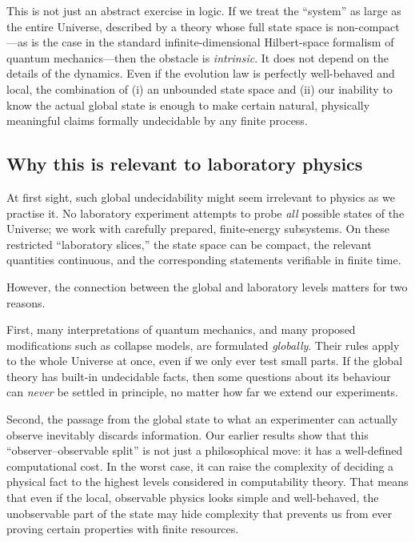 \documentclass[12pt]{article}
\theoremstyle{definition}
\theoremstyle{plain}
\begin{document}
This is not just an abstract exercise in logic. If we treat the ``system'' as
large as the entire Universe, described by a theory whose full state space is
non-compact---as is the case in the standard infinite-dimensional Hilbert-space
formalism of quantum mechanics---then the obstacle is \emph{intrinsic}. It does
not depend on the details of the dynamics. Even if the evolution law is
perfectly well-behaved and local, the combination of (i) an unbounded state
space and (ii) our inability to know the actual global state is enough to make
certain natural, physically meaningful claims formally undecidable by any
finite process.

\subsection{Why this is relevant to laboratory physics}

At first sight, such global undecidability might seem irrelevant to physics as
we practise it. No laboratory experiment attempts to probe \emph{all} possible
states of the Universe; we work with carefully prepared, finite-energy
subsystems. On these restricted ``laboratory slices,'' the state space can be
compact, the relevant quantities continuous, and the corresponding statements
verifiable in finite time.

However, the connection between the global and laboratory levels matters for
two reasons.

First, many interpretations of quantum mechanics, and many proposed
modifications such as collapse models, are formulated \emph{globally}. Their
rules apply to the whole Universe at once, even if we only ever test small
parts. If the global theory has built-in undecidable facts, then some questions
about its behaviour can \emph{never} be settled in principle, no matter how far
we extend our experiments.

Second, the passage from the global state to what an experimenter can actually
observe inevitably discards information. Our earlier results show that this
``observer--observable split'' is not just a philosophical move: it has a
well-defined computational cost. In the worst case, it can raise the complexity
of deciding a physical fact to the highest levels considered in computability
theory. That means that even if the local, observable physics looks simple and
well-behaved, the unobservable part of the state may hide complexity that
prevents us from ever proving certain properties with finite resources.
\end{document}
